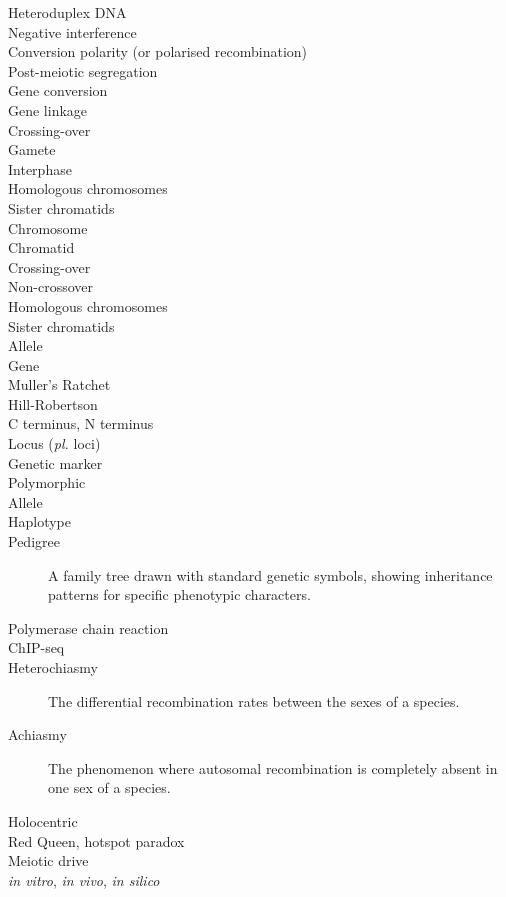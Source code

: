 \begin{alwayssingle}
\begin{description}
		\item[Heteroduplex DNA]
		\item[Negative interference]
		\item[Conversion polarity (or polarised recombination)]
		\item[Post-meiotic segregation]
		\item[Gene conversion]
		\item[Gene linkage]
		\item[Crossing-over]
		\item[Gamete]
		\item[Interphase]
		\item[Homologous chromosomes]
		\item[Sister chromatids]
		\item[Chromosome]
		\item[Chromatid]
		\item[Crossing-over]
		\item[Non-crossover]
		\item[Homologous chromosomes]
		\item[Sister chromatids]
		\item[Allele]
		\item[Gene]
		\item[Muller's Ratchet]
		\item[Hill-Robertson]
		\item[C terminus, N terminus]
		\item[Locus (\textit{pl.} loci)]
		\item[Genetic marker]
		\item[Polymorphic]
		\item[Allele]
		\item[Haplotype]
		\item[Pedigree] A family tree drawn with standard genetic symbols, showing inheritance patterns for specific phenotypic characters.
		\item[Polymerase chain reaction]
		\item[ChIP-seq]
		\item[Heterochiasmy] The differential recombination rates between the sexes of a species.
		\item[Achiasmy] The phenomenon where autosomal recombination is completely absent in one sex of a species.
		\item[Holocentric]
		\item[Red Queen, hotspot paradox]
		\item[Meiotic drive]
		\item[\textit{in vitro}, \textit{in vivo}, \textit{in silico}]

\end{description}
\end{alwayssingle}
